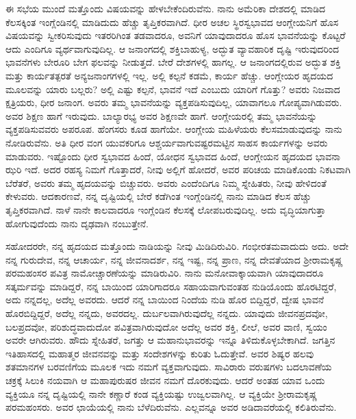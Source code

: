 \vskip 0.2cm

ಈ ಸಭೆಯ ಮುಂದೆ ಮತ್ತೊಂದು ವಿಷಯವನ್ನು ಹೇಳಬೇಕೆಂದಿರುವೆನು. ನಾನು ಅಮೆರಿಕಾ ದೇಶದಲ್ಲಿ ಮಾಡಿದ ಕೆಲಸಕ್ಕಿಂತ ಇಂಗ್ಲೆಂಡಿನಲ್ಲಿ ಮಾಡಿದುದು ಹೆಚ್ಚು ತೃಪ್ತಿಕರವಾಗಿದೆ. ಧೀರ ಅಚಲ ಸ್ಥಿರಸ್ವಭಾವದ ಆಂಗ್ಲೇಯನಿಗೆ ಹೊಸ ವಿಷಯವನ್ನು ಸ್ವೀಕರಿಸುವುದು ಇತರರಿಗಿಂತ ತಡವಾದರೂ, ಅವನಿಗೆ ಯಾವುದಾದರೂ ಹೊಸ ಭಾವನೆಯನ್ನು ಕೊಟ್ಟರೆ ಆದು ಎಂದಿಗೂ ವ್ಯರ್ಥವಾಗುವುದಿಲ್ಲ. ಆ ಜನಾಂಗದಲ್ಲಿ ಶಕ್ತಿಬಾಹುಳ್ಯ, ಅದ್ಭುತ ವ್ಯಾವಹಾರಿಕ ದೃಷ್ಟಿ ಇರುವುದರಿಂದ ಭಾವನೆಗಳು ಬೇರೂರಿ ಬೇಗ ಫಲವನ್ನು ನೀಡುತ್ತದೆ. ಬೇರೆ ದೇಶಗಳಲ್ಲಿ ಹಾಗಲ್ಲ. ಆ ಜನಾಂಗದಲ್ಲಿರುವ ಅದ್ಭುತ ಶಕ್ತಿ ಮತ್ತು ಕಾರ್ಯತತ್ಪರತೆ ಅನ್ಯಜನಾಂಗಗಳಲ್ಲಿ ಇಲ್ಲ. ಅಲ್ಲಿ ಕಲ್ಪನೆ ಕಡಮೆ, ಕಾರ್ಯ ಹೆಚ್ಚು. ಆಂಗ್ಲೇಯರ ಹೃದಯದ ಮೂಲವನ್ನು ಯಾರು ಬಲ್ಲರು? ಅಲ್ಲಿ ಎಷ್ಟು ಕಲ್ಪನೆ, ಭಾವನೆ ಇದೆ ಎಂಬುದು ಯಾರಿಗೆ ಗೊತ್ತು? ಅವರು ನಿಜವಾದ ಕ್ಷತ್ರಿಯರು, ಧೀರ ಜನಾಂಗ. ಅವರು ತಮ್ಮ ಭಾವನೆಯನ್ನು ವ್ಯಕ್ತಪಡಿಸುವುದಿಲ್ಲ, ಯಾವಾಗಲೂ ಗೋಪ್ಯವಾಗಿಡುವರು. ಅವರ ಶಿಕ್ಷಣ ಹಾಗೆ ಇರುವುದು. ಬಾಲ್ಯಾರಭ್ಯ ಅವರ ಶಿಕ್ಷಣವೇ ಹಾಗೆ. ಆಂಗ್ಲೇಯರಲ್ಲಿ ತಮ್ಮ ಭಾವನೆಯನ್ನು ವ್ಯಕ್ತಪಡಿಸುವವರು ಅಪರೂಪ. ಹೆಂಗಸರು ಕೂಡ ಹಾಗೆಯೇ. ಆಂಗ್ಲೇಯ ಮಹಿಳೆಯರು ಕೆಲಸಮಾಡುವುದನ್ನು ನಾನು ನೋಡಿರುವೆನು. ಅತಿ ಧೀರ ವಂಗ ಯುವಕರಿಗೂ ಆಶ್ಚರ್ಯವಾಗುವಷ್ಟರಮಟ್ಟಿನ ಸಾಹಸ ಕಾರ್ಯಗಳನ್ನು ಅವರು ಮಾಡುವರು. ಇಷ್ಟೊಂದು ಧೀರ ಸ್ವಭಾವದ ಹಿಂದೆ, ಯೋಧನ ಸ್ವಭಾವದ ಹಿಂದೆ, ಆಂಗ್ಲೇಯನ ಹೃದಯದ ಭಾವನಾ ಝರಿ ಇದೆ. ಅದರ ರಹಸ್ಯ ನಿಮಗೆ ಗೊತ್ತಾದರೆ, ನೀವು ಅಲ್ಲಿಗೆ ಹೋದರೆ, ಅವರ ಪರಿಚಯ ಮಾಡಿಕೊಂಡು ನಿಕಟವಾಗಿ ಬೆರೆತರೆ, ಅವರು ತಮ್ಮ ಹೃದಯವನ್ನು ಬಿಚ್ಚುವರು. ಅವರು ಎಂದೆಂದಿಗೂ ನಿಮ್ಮ ಸ್ನೇಹಿತರು, ನೀವು ಹೇಳಿದಂತೆ ಕೇಳುವರು. ಆದಕಾರಣವೆ, ನನ್ನ ದೃಷ್ಟಿಯಲ್ಲಿ ಬೇರೆ ಕಡೆಗಿಂತ ಇಂಗ್ಲೆಂಡಿನಲ್ಲಿ ನಾನು ಮಾಡಿದ ಕೆಲಸ ಹೆಚ್ಚು ತೃಪ್ತಿಕರವಾಗಿದೆ. ನಾಳೆ ನಾನೇ ಕಾಲವಾದರೂ ಇಂಗ್ಲೆಂಡಿನ ಕೆಲಸಕ್ಕೆ ಲೋಪಬರುವುದಿಲ್ಲ. ಅದು ವೃದ್ಧಿಯಾಗುತ್ತಾ ಹೋಗುವುದೆಂದು ನಾನು ದೃಢವಾಗಿ ನಂಬುತ್ತೇನೆ.

ಸಹೋದರರೇ, ನನ್ನ ಹೃದಯದ ಮತ್ತೊಂದು ನಾಡಿಯನ್ನು ನೀವು ಮಿಡಿದಿರುವಿರಿ. ಗಂಭೀರತಮವಾದುದು ಅದು. ಅದೇ ನನ್ನ ಗುರುದೇವ, ನನ್ನ ಆಚಾರ್ಯ, ನನ್ನ ಜೀವನಾದರ್ಶ, ನನ್ನ ಇಷ್ಟ, ನನ್ನ ಪ್ರಾಣ, ನನ್ನ ದೇವತೆಯಾದ ಶ‍್ರೀರಾಮಕೃಷ್ಣ ಪರಮಹಂಸರ ಪವಿತ್ರ ನಾಮೋಚ್ಚಾರಣೆಯನ್ನು ಮಾಡಿರುವಿರಿ. ನಾನು ಮನೋವಾಕ್ಕಾಯವಾಗಿ ಯಾವುದಾದರೂ ಸತ್ಕರ್ಮವನ್ನು ಮಾಡಿದ್ದರೆ, ನನ್ನ ಬಾಯಿಂದ ಯಾರಿಗಾದರೂ ಸಹಾಯವಾಗುವಂತಹ ನುಡಿಯೊಂದು ಹೊರಟಿದ್ದರೆ, ಅದು ನನ್ನದಲ್ಲ, ಅದೆಲ್ಲ ಅವರದು. ಆದರೆ ನನ್ನ ಬಾಯಿಂದ ನಿಂದೆಯ ನುಡಿ ಹೊರ ಬಿದ್ದಿದ್ದರೆ, ದ್ವೇಷ ಭಾವನೆ ಹೊರಬಿದ್ದಿದ್ದರೆ, ಅದೆಲ್ಲ ನನ್ನದು, ಅವರದಲ್ಲ. ದುರ್ಬಲವಾಗಿರುವುದೆಲ್ಲ ನನ್ನದು. ಯಾವುದು ಜೀವನಪ್ರದವೋ, ಬಲಪ್ರದವೋ, ಪರಿಶುದ್ಧವಾದುದೋ ಪವಿತ್ರವಾಗಿರುವುದೋ ಅದೆಲ್ಲ ಅವರ ಶಕ್ತಿ, ಲೀಲೆ, ಅವರ ವಾಣಿ, ಸ್ವಯಂ ಅವರೇ ಆಗಿರುವರು. ಹೌದು ಸ್ನೇಹಿತರೆ, ಜಗತ್ತು ಆ ಮಹಾನುಭಾವರನ್ನು ಇನ್ನೂ ತಿಳಿದುಕೊಳ್ಳಬೇಕಾಗಿದೆ. ಜಗತ್ತಿನ ಇತಿಹಾಸದಲ್ಲಿ ಮಹಾತ್ಮರ ಜೀವನವನ್ನು ಮತ್ತು ಸಂದೇಶಗಳನ್ನು ಕುರಿತು ಓದುತ್ತೇವೆ. ಅವರ ಶಿಷ್ಯರ ಹಲವು ಶತಮಾನಗಳ ಬರವಣಿಗೆಯ ಮೂಲಕ ಇದು ನಮಗೆ ವ್ಯಕ್ತವಾಗುವುದು. ಸಾವಿರಾರು ವರುಷಗಳು ಬದಲಾವಣೆಯ ಚಕ್ರಕ್ಕೆ ಸಿಲುಕಿ ನಯವಾಗಿ ಆ ಮಹಾಪುರುಷರ ಜೀವನ ನಮಗೆ ದೊರಕುವುದು. ಆದರೆ ಅಂತಹ ಯಾವ ಒಂದು ವ್ಯಕ್ತಿಯೂ ನನ್ನ ದೃಷ್ಟಿಯಲ್ಲಿ ನಾನೇ ಕಣ್ಣಾರೆ ಕಂಡ ವ್ಯಕ್ತಿಯಷ್ಟು ಉಜ್ವಲವಾಗಿಲ್ಲ. ಆ ವ್ಯಕ್ತಿಯೇ ಶ‍್ರೀರಾಮಕೃಷ್ಣ ಪರಮಹಂಸರು. ಅವರ ಛಾಯೆಯಲ್ಲಿ ನಾನು ಬೆಳೆದಿರುವೆನು. ಎಲ್ಲವನ್ನೂ ಅವರ ಅಡಿದಾವರೆಯಲ್ಲಿ ಕಲಿತಿರುವೆನು.

